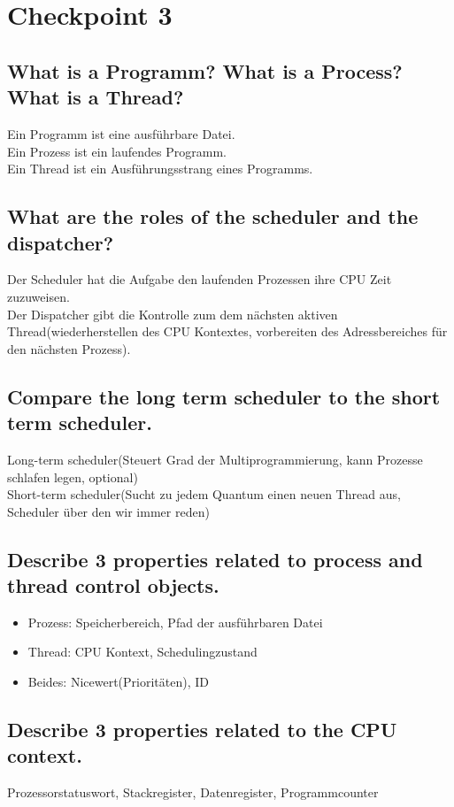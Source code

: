\section{Checkpoint 3}

\addtocounter{subsection}{1}

\subsection{What is a Programm? What is a Process? What is a Thread?}
Ein Programm ist eine ausf\"uhrbare Datei.\\
Ein Prozess ist ein laufendes Programm.\\
Ein Thread ist ein Ausf\"uhrungsstrang eines Programms.

\subsection{What are the roles of the scheduler and the dispatcher?}
Der Scheduler hat die Aufgabe den laufenden Prozessen ihre CPU Zeit zuzuweisen.\\
Der Dispatcher gibt die Kontrolle zum dem n\"achsten aktiven Thread(wiederherstellen des CPU Kontextes, vorbereiten des Adressbereiches f\"ur den n\"achsten Prozess).

\subsection{Compare the long term scheduler to the short term scheduler.}
Long-term scheduler(Steuert Grad der Multiprogrammierung, kann Prozesse schlafen legen, optional)\\
Short-term scheduler(Sucht zu jedem Quantum einen neuen Thread aus, Scheduler \"uber den wir immer reden)

\subsection{Describe 3 properties related to process and thread control objects.}
\begin{itemize}
	\item Prozess: Speicherbereich, Pfad der ausf\"uhrbaren Datei
	\item Thread: CPU Kontext, Schedulingzustand
	\item Beides: Nicewert(Priorit\"aten), ID
\end{itemize}

\subsection{Describe 3 properties related to the CPU context.}
Prozessorstatuswort, Stackregister, Datenregister, Programmcounter

